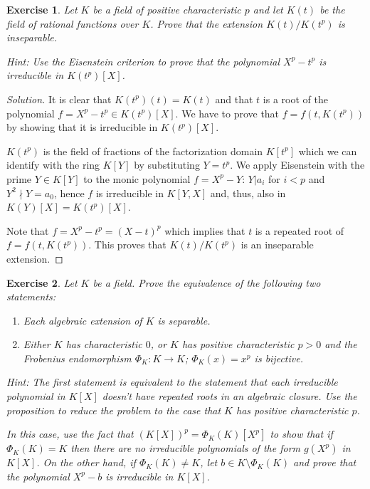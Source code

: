 \documentclass[a4paper,10pt,reqno]{amsart}
\newtheorem{ex}{Exercise}[section]
\newenvironment{sol}
  {\renewcommand\qedsymbol{$\blacksquare$}\begin{proof}[Solution]}
  {\end{proof}}
\begin{document}
\begin{ex}
\label{6.3}
    Let $K$ be a field of positive characteristic $p$ and let $K(t)$ be the field of rational functions over $K$. Prove that the extension $K(t)/K(t^p)$ is inseparable.

    \noindent\textit{Hint:} Use the Eisenstein criterion to prove that the polynomial $X^p-t^p$ is irreducible in $K(t^p)[X]$.
\end{ex}
\begin{sol}
    It is clear that $K(t^p)(t) = K(t)$ and that $t$ is a root of the polynomial $f = X^p - t^p \in K(t^p)[X]$. We have to prove that $f = f(t,K(t^p))$ by showing that it is irreducible in $K(t^p)[X]$.

    $K(t^p)$ is the field of fractions of the factorization domain $K[t^p]$ which we can identify with the ring $K[Y]$ by substituting $Y = t^p$. We apply Eisenstein with the prime $Y \in K[Y]$ to the monic polynomial $f = X^p - Y$: $Y | a_i$ for $i < p$ and $Y^2 \nmid Y = a_0$, hence $f$ is irreducible in $K[Y,X]$ and, thus, also in $K(Y)[X]=K(t^p)[X]$.

    Note that $f = X^p - t^p = (X - t)^p$ which implies that $t$ is a repeated root of $f = f(t, K(t^p))$. This proves that $K(t)/K(t^p)$ is an inseparable extension. 
\end{sol}

\begin{ex}
\label{6.4}
    Let $K$ be a field. Prove the equivalence of the following two statements:

    \begin{enumerate}
        \item Each algebraic extension of $K$ is separable.
        \item \textit{Either} $K$ has characteristic $0$, \textit{or} $K$ has positive characteristic $p > 0$ and the Frobenius endomorphism $\Phi_K: K \to K$; $\Phi_K(x) = x^p$ is bijective.
    \end{enumerate}

    \noindent\textit{Hint:} The first statement is equivalent to the statement that each irreducible polynomial in $K[X]$ doesn't have repeated roots in an algebraic closure. Use the proposition to reduce the problem to the case that $K$ has positive characteristic $p$.

    In this case, use the fact that $(K[X])^p = \Phi_K(K)[X^p]$ to show that if $\Phi_K(K) = K$ then there are no irreducible polynomials of the form $g(X^p)$ in $K[X]$. On the other hand, if $\Phi_K(K) \neq K$, let $b \in K \setminus \Phi_K(K)$ and prove that the polynomial $X^p - b$ is irreducible in $K[X]$.
    
\end{ex}
\end{document}
